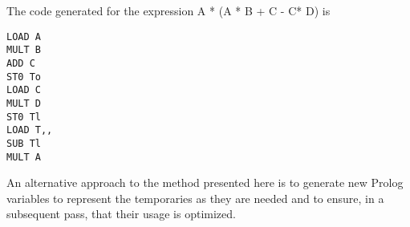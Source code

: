 The code generated for the expression A * (A * B + C - C* D) is
\begin{verbatim}
LOAD A
MULT B
ADD C
ST0 To
LOAD C
MULT D
ST0 Tl
LOAD T,,
SUB Tl
MULT A 
\end{verbatim}

An alternative approach to the method presented here is to generate new
Prolog variables to represent the temporaries as they are needed and to ensure,
in a subsequent pass, that their usage is optimized. 

